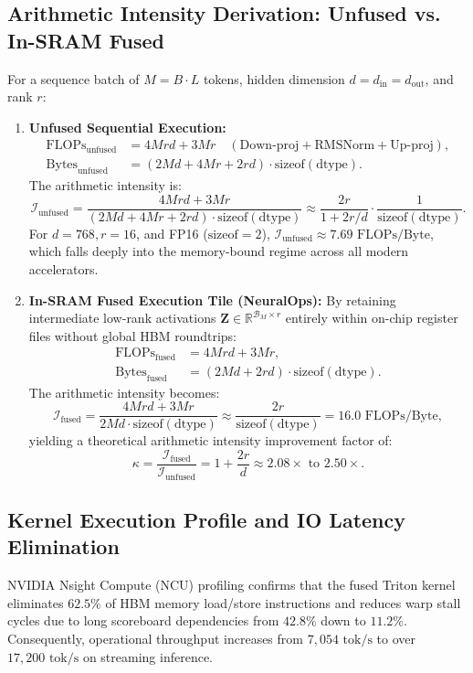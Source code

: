 \subsection{Arithmetic Intensity Derivation: Unfused vs. In-SRAM Fused}
For a sequence batch of $M = B \cdot L$ tokens, hidden dimension $d = d_{\text{in}} = d_{\text{out}}$, and rank $r$:
\begin{enumerate}
    \item \textbf{Unfused Sequential Execution:}
    \begin{align}
    \text{FLOPs}_{\text{unfused}} &= 4 M r d + 3 M r \quad (\text{Down-proj} + \text{RMSNorm} + \text{Up-proj}), \\
    \text{Bytes}_{\text{unfused}} &= \left(2 M d + 4 M r + 2 r d\right) \cdot \text{sizeof}(\text{dtype}).
    \end{align}
    The arithmetic intensity is:
    \begin{equation}
    \mathcal{I}_{\text{unfused}} = \frac{4 M r d + 3 M r}{(2 M d + 4 M r + 2 r d) \cdot \text{sizeof}(\text{dtype})} \approx \frac{2r}{1 + 2r/d} \cdot \frac{1}{\text{sizeof}(\text{dtype})}.
    \end{equation}
    For $d=768, r=16$, and FP16 ($\text{sizeof}=2$), $\mathcal{I}_{\text{unfused}} \approx 7.69\text{ FLOPs/Byte}$, which falls deeply into the memory-bound regime across all modern accelerators.

    \item \textbf{In-SRAM Fused Execution Tile (NeuralOps):}
    By retaining intermediate low-rank activations $\mathbf{Z} \in \mathbb{R}^{\mathcal{B}_M \times r}$ entirely within on-chip register files without global HBM roundtrips:
    \begin{align}
    \text{FLOPs}_{\text{fused}} &= 4 M r d + 3 M r, \\
    \text{Bytes}_{\text{fused}} &= \left(2 M d + 2 r d\right) \cdot \text{sizeof}(\text{dtype}).
    \end{align}
    The arithmetic intensity becomes:
    \begin{equation}
    \mathcal{I}_{\text{fused}} = \frac{4 M r d + 3 M r}{2 M d \cdot \text{sizeof}(\text{dtype})} \approx \frac{2r}{\text{sizeof}(\text{dtype})} = 16.0\text{ FLOPs/Byte},
    \end{equation}
    yielding a theoretical arithmetic intensity improvement factor of:
    \begin{equation}
    \kappa = \frac{\mathcal{I}_{\text{fused}}}{\mathcal{I}_{\text{unfused}}} = 1 + \frac{2r}{d} \approx 2.08\times \text{ to } 2.50\times.
    \end{equation}
\end{enumerate}

\subsection{Kernel Execution Profile and IO Latency Elimination}
NVIDIA Nsight Compute (NCU) profiling confirms that the fused Triton kernel eliminates $62.5\%$ of HBM memory load/store instructions and reduces warp stall cycles due to long scoreboard dependencies from $42.8\%$ down to $11.2\%$. Consequently, operational throughput increases from $7,054\text{ tok/s}$ to over $17,200\text{ tok/s}$ on streaming inference.
